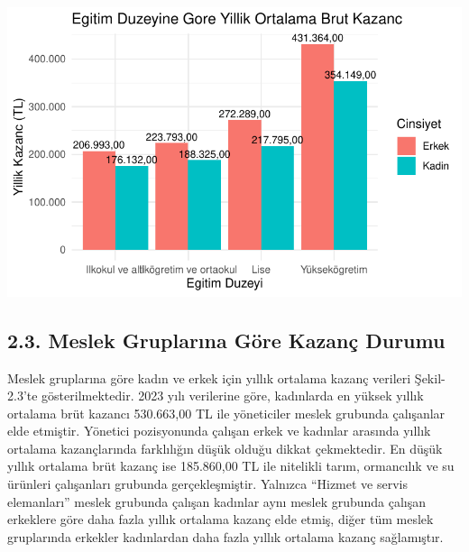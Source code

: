 \documentclass[
  11pt,
  a4paper,
  DIV=11,
  numbers=noendperiod]{scrartcl}
\begin{document}
\includegraphics{project_files/figure-pdf/unnamed-chunk-3-1.pdf}

\subsection{2.3. Meslek Gruplarına Göre Kazanç
Durumu}\label{meslek-gruplarux131na-guxf6re-kazanuxe7-durumu}

Meslek gruplarına göre kadın ve erkek için yıllık ortalama kazanç
verileri Şekil-2.3'te gösterilmektedir. 2023 yılı verilerine göre,
kadınlarda en yüksek yıllık ortalama brüt kazancı 530.663,00 TL ile
yöneticiler meslek grubunda çalışanlar elde etmiştir. Yönetici
pozisyonunda çalışan erkek ve kadınlar arasında yıllık ortalama
kazançlarında farklılığın düşük olduğu dikkat çekmektedir. En düşük
yıllık ortalama brüt kazanç ise 185.860,00 TL ile nitelikli tarım,
ormancılık ve su ürünleri çalışanları grubunda gerçekleşmiştir. Yalnızca
``Hizmet ve servis elemanları'' meslek grubunda çalışan kadınlar aynı
meslek grubunda çalışan erkeklere göre daha fazla yıllık ortalama kazanç
elde etmiş, diğer tüm meslek gruplarında erkekler kadınlardan daha fazla
yıllık ortalama kazanç sağlamıştır.
\end{document}
